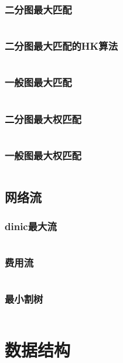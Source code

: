 \documentclass{article}
\begin{document}
\subsubsection{二分图最大匹配}
\inputminted[breaklines]{c++}{../图论/hungary.cpp}

\subsubsection{二分图最大匹配的HK算法}
\inputminted[breaklines]{c++}{../图论/HK.cpp}

\subsubsection{一般图最大匹配}
\inputminted[breaklines]{c++}{../图论/一般图最大匹配.cpp}

\subsubsection{二分图最大权匹配}
\inputminted[breaklines]{c++}{../图论/KM.cpp}

\subsubsection{一般图最大权匹配}
\inputminted[breaklines]{c++}{../图论/一般图最大权匹配.cpp}

\subsection{网络流}

\subsubsection{dinic最大流}
\inputminted[breaklines]{c++}{../图论/dinic最大流.cpp}

\subsubsection{费用流}
\inputminted[breaklines]{c++}{../图论/费用流.cpp} 

\subsubsection{最小割树}
\inputminted[breaklines]{c++}{../图论/最小割树.cpp} 

\newpage
\section{数据结构}
\end{document}

